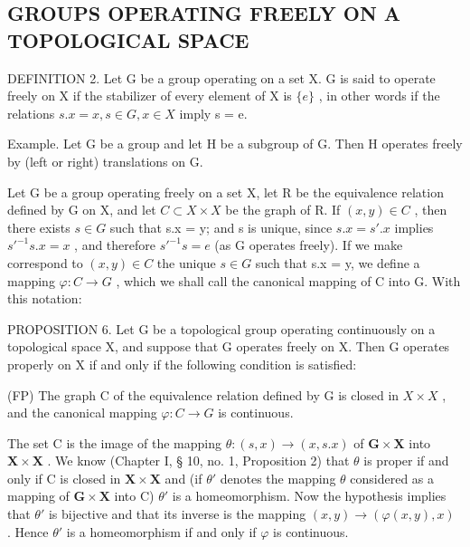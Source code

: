 \subsection{GROUPS OPERATING FREELY ON A TOPOLOGICAL SPACE}

DEFINITION 2. Let G be a group operating on a set X. G is said to operate freely on X if the stabilizer of every element of X is \(\{e\}\) , in other words if the relations \(s.x = x, s \in G, x \in X\) imply s = e.

Example. Let G be a group and let H be a subgroup of G. Then H operates freely by (left or right) translations on G.

Let G be a group operating freely on a set X, let R be the equivalence relation defined by G on X, and let \(C \subset X \times X\) be the graph of R. If \((x, y) \in C\) , then there exists \(s \in G\) such that s.x = y; and s is unique, since \(s.x = s'.x\) implies \(s'^{-1}s.x = x\) , and therefore \(s'^{-1}s = e\) (as G operates freely). If we make correspond to \((x, y) \in C\) the unique \(s \in G\) such that s.x = y, we define a mapping \(\varphi: C \to G\) , which we shall call the canonical mapping of C into G. With this notation:

PROPOSITION 6. Let G be a topological group operating continuously on a topological space X, and suppose that G operates freely on X. Then G operates properly on X if and only if the following condition is satisfied:

(FP) The graph C of the equivalence relation defined by G is closed in \(X \times X\) , and the canonical mapping \(\varphi: C \rightarrow G\) is continuous.

The set C is the image of the mapping \(\theta: (s, x) \to (x, s.x)\) of \(\mathbf{G} \times \mathbf{X}\) into \(\mathbf{X} \times \mathbf{X}\) . We know (Chapter I, § 10, no. 1, Proposition 2) that \(\theta\) is proper if and only if C is closed in \(\mathbf{X} \times \mathbf{X}\) and (if \(\theta'\) denotes the mapping \(\theta\) considered as a mapping of \(\mathbf{G} \times \mathbf{X}\) into C) \(\theta'\) is a homeomorphism. Now the hypothesis implies that \(\theta'\) is bijective and that its inverse is the mapping \((x, y) \to (\varphi(x, y), x)\) . Hence \(\theta'\) is a homeomorphism if and only if \(\varphi\) is continuous.

